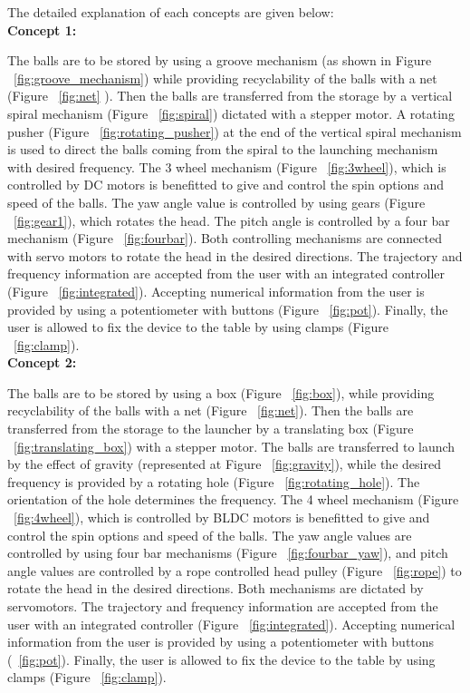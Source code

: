 \documentclass[12pt]{report}
\begin{document}
The detailed explanation of each concepts are given below: \\

    
    \textbf{Concept 1:}
    
    The balls are to be stored by using a groove mechanism (as shown in Figure ~\ref{fig:groove_mechanism}) while providing recyclability of the balls with a net (Figure ~\ref{fig:net} ). Then the balls are transferred from the storage by a vertical spiral mechanism (Figure ~\ref{fig:spiral}) dictated with a stepper motor. A rotating pusher (Figure ~\ref{fig:rotating_pusher}) at the end of the vertical spiral mechanism is used to direct the balls coming from the spiral to the launching mechanism with desired frequency. The 3 wheel mechanism (Figure ~\ref{fig:3wheel}), which is controlled by DC motors is benefitted to give and control the spin options and speed of the balls. The yaw angle value is controlled by using gears (Figure ~\ref{fig:gear1}), which rotates the head. The pitch angle is controlled by a four bar mechanism (Figure ~\ref{fig:fourbar}). Both controlling mechanisms are connected with servo motors to rotate the head in the desired directions. The trajectory and frequency information are accepted from the user with an integrated controller (Figure ~\ref{fig:integrated}). Accepting numerical information from the user is provided by using a potentiometer with buttons (Figure ~\ref{fig:pot}). Finally, the user is allowed to fix the device to the table by using clamps (Figure ~\ref{fig:clamp}). \\

    \textbf{Concept 2:}
    
    The balls are to be stored by using a box (Figure ~\ref{fig:box}), while providing recyclability of the balls with a net (Figure ~\ref{fig:net}). Then the balls are transferred from the storage to the launcher by a translating box (Figure ~\ref{fig:translating_box}) with a stepper motor. The balls are transferred to launch by the effect of gravity (represented at Figure ~\ref{fig:gravity}), while the desired frequency is provided by a rotating hole (Figure ~\ref{fig:rotating_hole}). The orientation of the hole determines the frequency. The 4 wheel mechanism (Figure ~\ref{fig:4wheel}), which is controlled by BLDC motors is benefitted to give and control the spin options and speed of the balls. The yaw angle values are controlled by using four bar mechanisms (Figure ~\ref{fig:fourbar_yaw}), and pitch angle values are controlled by a rope controlled head pulley (Figure ~\ref{fig:rope})  to rotate the head in the desired directions. Both mechanisms are dictated by servomotors. The trajectory and frequency information are accepted from the user with an integrated controller (Figure ~\ref{fig:integrated}). Accepting numerical information from the user is provided by using a potentiometer with buttons (~\ref{fig:pot}). Finally, the user is allowed to fix the device to the table by using clamps (Figure ~\ref{fig:clamp}). \\
\end{document}
